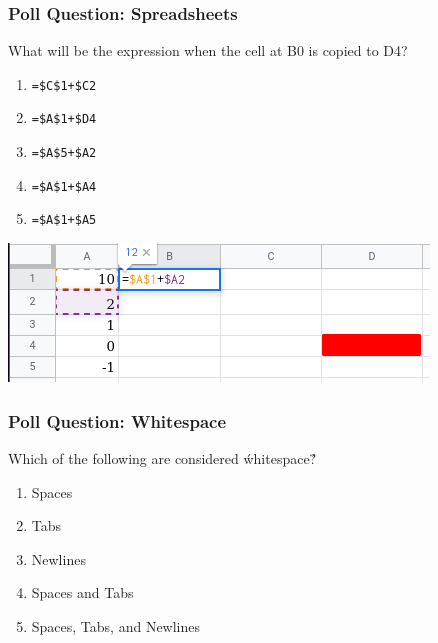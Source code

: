 \documentclass{beamer}
\begin{document}
%
%
%
\begin{frame}[fragile]
  \frametitle{Poll Question: Spreadsheets}
  What will be the expression when the cell at B0 is copied to D4?
  \vfill
  \begin{minipage}{.48\textwidth}
    \begin{enumerate}
      \item \lstinline{=$C$1+$C2}
      \item \lstinline{=$A$1+$D4}
      \item \lstinline{=$A$5+$A2}
      \item \lstinline{=$A$1+$A4}
      \item \lstinline{=$A$1+$A5}
    \end{enumerate}
  \end{minipage}
  \begin{minipage}{.48\textwidth}
    \includegraphics[width=\textwidth]{./imgs/spreadsheet-slide-2.png}
  \end{minipage}
\end{frame}

%
%
%
\begin{frame}[fragile]
  \frametitle{Poll Question: Whitespace}
  Which of the following are considered \'whitespace\'?
  \vfill
  \begin{enumerate}
    \item Spaces
    \item Tabs
    \item Newlines
    \item Spaces and Tabs
    \item Spaces, Tabs, and Newlines
  \end{enumerate}
\end{frame}


%
%
%
\end{document}
